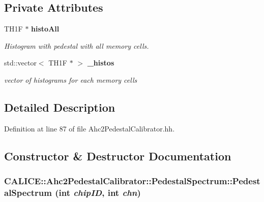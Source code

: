 \subsection*{Private Attributes}
\begin{DoxyCompactItemize}
\item 
TH1F $\ast$ {\bf histoAll}\label{classCALICE_1_1Ahc2PedestalCalibrator_1_1PedestalSpectrum_a1b2d35a3e63dba3ff5dd98277f1600d4}

\begin{DoxyCompactList}\small\item\em Histogram with pedestal with all memory cells. \item\end{DoxyCompactList}\item 
std::vector$<$ TH1F $\ast$ $>$ {\bf \_\-histos}\label{classCALICE_1_1Ahc2PedestalCalibrator_1_1PedestalSpectrum_a9731a0fb9d895d3f5de1b3f48ebc6d72}

\begin{DoxyCompactList}\small\item\em vector of histograms for each memory cells \item\end{DoxyCompactList}\end{DoxyCompactItemize}


\subsection{Detailed Description}


Definition at line 87 of file Ahc2PedestalCalibrator.hh.

\subsection{Constructor \& Destructor Documentation}
\subsubsection[{PedestalSpectrum}]{\setlength{\rightskip}{0pt plus 5cm}CALICE::Ahc2PedestalCalibrator::PedestalSpectrum::PedestalSpectrum (int {\em chipID}, \/  int {\em chn})}\label{classCALICE_1_1Ahc2PedestalCalibrator_1_1PedestalSpectrum_a0a2027acbf11acdad38d43865326d6ec}


